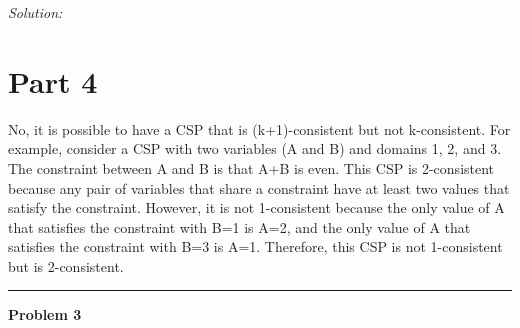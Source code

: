 \documentclass[a4paper, 11pt]{article}
\newenvironment{problem}[2][Problem]
    { \begin{mdframed}[backgroundcolor=gray!20] \textbf{#1 #2} \\}
    {  \end{mdframed}}
\newenvironment{solution}
    {\textit{Solution:}}
    {}
\begin{document}
{\begin{solution}
\section*{\small Part 4}
No, it is possible to have a CSP that is (k+1)-consistent but not k-consistent. For example, consider a CSP with two variables (A and B) and domains 1, 2, and 3. The constraint between A and B is that A+B is even. This CSP is 2-consistent because any pair of variables that share a constraint have at least two values that satisfy the constraint. However, it is not 1-consistent because the only value of A that satisfies the constraint with B=1 is A=2, and the only value of A that satisfies the constraint with B=3 is A=1. Therefore, this CSP is not 1-consistent but is 2-consistent.
\end{solution} 
\\\noindent\rule{7in}{2.8pt}
%
\pagebreak
\begin{problem}{3}


\end{problem}}
\end{document}
